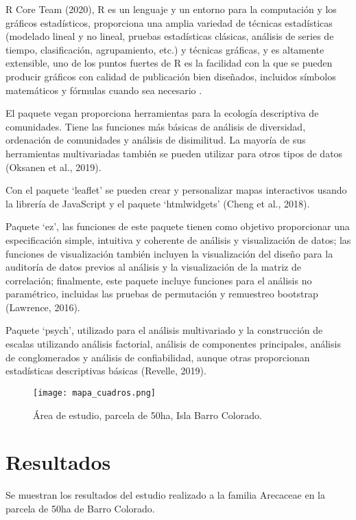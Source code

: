 \documentclass[11pt,]{article}
\begin{document}
R Core Team (2020), R es un lenguaje y un entorno para la computación y
los gráficos estadísticos, proporciona una amplia variedad de técnicas
estadísticas (modelado lineal y no lineal, pruebas estadísticas
clásicas, análisis de series de tiempo, clasificación, agrupamiento,
etc.) y técnicas gráficas, y es altamente extensible, uno de los puntos
fuertes de R es la facilidad con la que se pueden producir gráficos con
calidad de publicación bien diseñados, incluidos símbolos matemáticos y
fórmulas cuando sea necesario .

El paquete vegan proporciona herramientas para la ecología descriptiva
de comunidades. Tiene las funciones más básicas de análisis de
diversidad, ordenación de comunidades y análisis de disimilitud. La
mayoría de sus herramientas multivariadas también se pueden utilizar
para otros tipos de datos (Oksanen et al., 2019).

Con el paquete `leaflet' se pueden crear y personalizar mapas
interactivos usando la librería de JavaScript y el paquete `htmlwidgets'
(Cheng et al., 2018).

Paquete `ez', las funciones de este paquete tienen como objetivo
proporcionar una especificación simple, intuitiva y coherente de
análisis y visualización de datos; las funciones de visualización
también incluyen la visualización del diseño para la auditoría de datos
previos al análisis y la visualización de la matriz de correlación;
finalmente, este paquete incluye funciones para el análisis no
paramétrico, incluidas las pruebas de permutación y remuestreo bootstrap
(Lawrence, 2016).

Paquete `psych', utilizado para el análisis multivariado y la
construcción de escalas utilizando análisis factorial, análisis de
componentes principales, análisis de conglomerados y análisis de
confiabilidad, aunque otras proporcionan estadísticas descriptivas
básicas (Revelle, 2019).

\begin{figure}
\centering
\texttt{[image: mapa\_cuadros.png]}
\caption{Área de estudio, parcela de 50ha, Isla Barro Colorado.
\label{fig:mapa_cuadros}}
\end{figure}

\section{Resultados}\label{resultados}

Se muestran los resultados del estudio realizado a la familia Arecaceae
en la parcela de 50ha de Barro Colorado.
\end{document}
